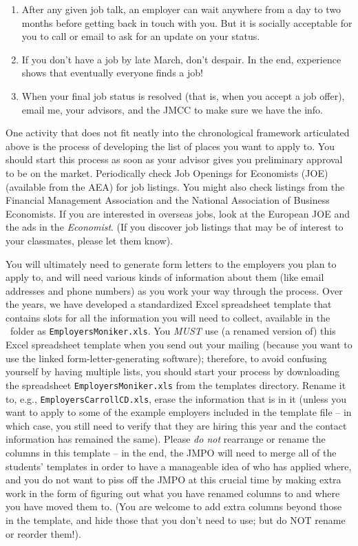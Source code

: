 \documentclass{econtex}
\begin{document}
\begin{enumerate}
\item After any given job talk, an employer can wait anywhere from a
  day to two months before getting back in touch with you.  But it is
  socially acceptable for you to call or email to ask for an update on
  your status.
  
\item If you don't have a job by late March, don't despair.  In the
  end, experience shows that eventually everyone finds a job!

\item When your final job status is resolved (that is, when you accept 
a job offer), email me, your advisors, and the JMCC to make sure we have the info.

\end{enumerate}
  
One activity that does not fit neatly into the chronological framework
articulated above is the process of developing the list of places you
want to apply to.  You should start this process as soon as your
advisor gives you preliminary approval to be on the market.
Periodically check Job Openings for Economists (JOE) (available from
the AEA) for job listings.  You might also check listings from the
Financial Management Association and the National Association of
Business Economists.  If you are interested in overseas jobs, look at
the European JOE and the ads in the {\it Economist}.  (If you discover
job listings that may be of interest to your classmates, please let
them know).

You will ultimately need to generate form letters to the employers you
plan to apply to, and will need various kinds of information about
them (like email addresses and phone numbers) as you work your way
through the process.  Over the years, we have developed a standardized
Excel spreadsheet template that contains slots for all the information
you will need to collect, available in the \Templates~folder as
\texttt{EmployersMoniker.xls}.  You {\it MUST} use (a renamed version
of) this Excel spreadsheet template when you send out your mailing
(because you want to use the linked form-letter-generating software);
therefore, to avoid confusing yourself by having multiple lists, you
should start your process by downloading the spreadsheet
\texttt{EmployersMoniker.xls} from the templates directory.  Rename
it to, e.g., \texttt{EmployersCarrollCD.xls}, erase the information
that is in it (unless you want to apply to some of the example
employers included in the template file -- in which case, you still
need to verify that they are hiring this year and the contact
information has remained the same).  Please {\it do not} rearrange or
rename the columns in this template -- in the end, the JMPO will need
to merge all of the students' templates in order to have a manageable
idea of who has applied where, and you do not want to piss off the
JMPO at this crucial time by making extra work in the form of figuring
out what you have renamed columns to and where you have moved them to.
(You are welcome to add extra columns beyond those in the template,
and hide those that you don't need to use; but do NOT rename or
reorder them!).
\end{document}
